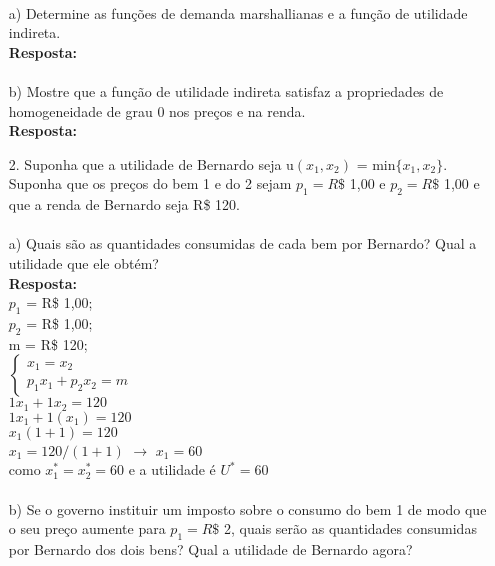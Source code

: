 \begin{enumerate}
\paragraph{} a) Determine as funções de demanda marshallianas e a função de utilidade indireta.\\

\textbf{Resposta:}\\

\paragraph{} b) Mostre que a função de utilidade indireta satisfaz a propriedades de homogeneidade de
grau 0 nos preços e na renda.\\

\textbf{Resposta:}\\

\item[2.] Suponha que a utilidade de Bernardo seja u{$(x_1, x_2)$} = min{$\{x_1, x_2\}$}. Suponha que os preços do bem 1 e do 2 sejam {$p_1 = R\$ $} 1,00 e {$p_2 = R\$ $} 1,00 e que a renda de Bernardo seja R\$ 120.

\paragraph{} a) Quais são as quantidades consumidas de cada bem por Bernardo? Qual a utilidade que
ele obtém?\\

\textbf{Resposta:}\\

{$p_1$ = R\$ 1,00};\\
{$p_2$ = R\$ 1,00};\\
m = R\$ 120;\\

{$\begin{cases} x_{1} = x_{2}\\
p_{1}x_{1}+p_{2}x_{2}=m
\end{cases}$}\\


{$1x_{1}+1x_{2} = 120$}\\
{$1x_{1}+1(x_{1}) = 120$}\\
{$x_1(1+1) = 120$}\\
{$x_1 = 120/(1+1)$} {$\rightarrow$} {$x_{1} = 60$}\\
como {$x_{1}^{*} = x_{2}^{*} = 60$} e a utilidade é {$U^{*} = 60$}


\paragraph{} b) Se o governo instituir um imposto sobre o consumo do bem 1 de modo que o seu preço
aumente para {$p_1 = R\$ $} 2, quais serão as quantidades consumidas por Bernardo dos dois bens? Qual a utilidade de Bernardo agora?\\


\end{enumerate}
